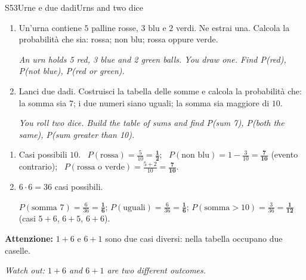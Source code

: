 \documentclass[11pt,a4paper]{article}
\newcommand{\en}[1]{\par{\small\itshape\color{engray}#1\par}}
\newcommand{\errore}[2]{\begin{attenzione}\textbf{\color{fgA}Attenzione:} #1\par
  {\itshape\color{engray}Watch out: #2}\end{attenzione}}
\begin{document}
\begin{esercizio}{S5}{3}{Urne e due dadi}{Urns and two dice}
\begin{enumerate}
\item Un'urna contiene $5$ palline rosse, $3$ blu e $2$ verdi. Ne estrai una. Calcola la probabilità che sia: rossa; non blu; rossa oppure verde.
\en{An urn holds 5 red, 3 blue and 2 green balls. You draw one. Find P(red), P(not blue), P(red or green).}
\item Lanci due dadi. Costruisci la tabella delle somme e calcola la probabilità che: la somma sia $7$; i due numeri siano uguali; la somma sia maggiore di $10$.
\en{You roll two dice. Build the table of sums and find P(sum 7), P(both the same), P(sum greater than 10).}
\end{enumerate}
\end{esercizio}
\begin{solbox}
\begin{enumerate}
\item Casi possibili $10$. \ $P(\text{rossa})=\frac{5}{10}=\mathbf{\frac12}$; \ $P(\text{non blu})=1-\frac{3}{10}=\mathbf{\frac{7}{10}}$ (evento contrario); \ $P(\text{rossa o verde})=\frac{5+2}{10}=\mathbf{\frac{7}{10}}$.
\item $6\cdot6=36$ casi possibili.
\begin{center}
\end{center}
$P(\text{somma }7)=\frac{6}{36}=\mathbf{\frac16}$; \quad $P(\text{uguali})=\frac{6}{36}=\mathbf{\frac16}$; \quad $P(\text{somma}>10)=\frac{3}{36}=\mathbf{\frac{1}{12}}$ (casi $5{+}6$, $6{+}5$, $6{+}6$).
\end{enumerate}
\errore{$1+6$ e $6+1$ sono due casi diversi: nella tabella occupano due caselle.}{$1+6$ and $6+1$ are two different outcomes.}
\end{solbox}
\end{document}
